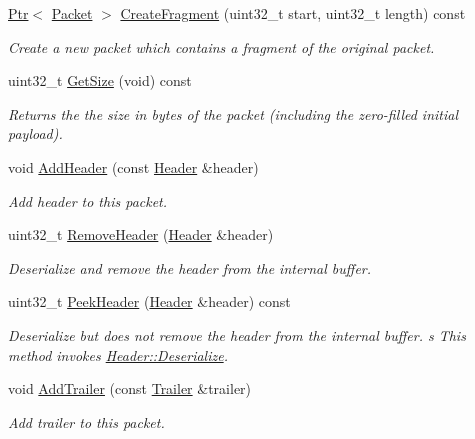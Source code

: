 \begin{DoxyCompactItemize}
\hyperlink{classns3_1_1Ptr}{Ptr}$<$ \hyperlink{classns3_1_1Packet}{Packet} $>$ \hyperlink{classns3_1_1Packet_a16f6113606b355b2b346e2245fa2a3d0}{Create\+Fragment} (uint32\+\_\+t start, uint32\+\_\+t length) const 
\begin{DoxyCompactList}\small\item\em Create a new packet which contains a fragment of the original packet. \end{DoxyCompactList}\item 
uint32\+\_\+t \hyperlink{classns3_1_1Packet_a462855c9929954d4301a4edfe55f4f1c}{Get\+Size} (void) const 
\begin{DoxyCompactList}\small\item\em Returns the the size in bytes of the packet (including the zero-\/filled initial payload). \end{DoxyCompactList}\item 
void \hyperlink{classns3_1_1Packet_a465108c595a0bc592095cbcab1832ed8}{Add\+Header} (const \hyperlink{classns3_1_1Header}{Header} \&header)
\begin{DoxyCompactList}\small\item\em Add header to this packet. \end{DoxyCompactList}\item 
uint32\+\_\+t \hyperlink{classns3_1_1Packet_a0961eccf975d75f902d40956c93ba63e}{Remove\+Header} (\hyperlink{classns3_1_1Header}{Header} \&header)
\begin{DoxyCompactList}\small\item\em Deserialize and remove the header from the internal buffer. \end{DoxyCompactList}\item 
uint32\+\_\+t \hyperlink{classns3_1_1Packet_aadc63487bea70945c418f4c3e9b81964}{Peek\+Header} (\hyperlink{classns3_1_1Header}{Header} \&header) const 
\begin{DoxyCompactList}\small\item\em Deserialize but does {\itshape not} remove the header from the internal buffer. s This method invokes \hyperlink{classns3_1_1Header_a78be9400bb66b2a8543606f395ef5396}{Header\+::\+Deserialize}. \end{DoxyCompactList}\item 
void \hyperlink{classns3_1_1Packet_ae26b490c30ae5bc98be5181ec6e06db8}{Add\+Trailer} (const \hyperlink{classns3_1_1Trailer}{Trailer} \&trailer)
\begin{DoxyCompactList}\small\item\em Add trailer to this packet. \end{DoxyCompactList}\item 

\end{DoxyCompactItemize}
